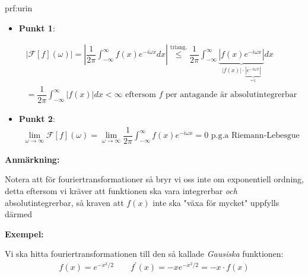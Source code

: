 \begin{prf}[Punkt 1,2]{prf:urin}
  \begin{itemize}
    \item\textbf{Punkt 1}:\par
      \begin{equation*}
        \begin{gathered}
          \left|\mathcal{F}[f](\omega)\right| = \left|\dfrac{1}{2\pi}\int_{-\infty}^{\infty}f(x)e^{-i\omega x}dx\right|\stackrel{\text{triang.}}{\leq}\dfrac{1}{2\pi}\int_{-\infty}^{\infty}\underbrace{\left|f(x)e^{-i\omega x}\right|}_{\text{$\left|f(x)\right|\cdot\underbrace{\left|e^{-i\omega x}\right|}_{\text{=1}}$}}dx\\
          = \dfrac{1}{2\pi}\int_{-\infty}^{\infty}\left|f(x)\right|dx<\infty\text{ eftersom $f$ per antagande är absolutintegrerbar}
        \end{gathered}
      \end{equation*}
      \par\bigskip
    \item\textbf{Punkt 2}:
      \begin{equation*}
        \begin{gathered}
          \lim_{\omega\to\infty}\mathcal{F}[f](\omega) = \lim_{\omega\to\infty}\dfrac{1}{2\pi}\int_{-\infty}^{\infty}f(x)e^{-i\omega x} = 0\text{ p.g.a Riemann-Lebesgue}
        \end{gathered}
      \end{equation*}
  \end{itemize}
\end{prf}
\par\bigskip
\noindent\textbf{Anmärkning:}\par
\noindent Notera att för fouriertransformationer så bryr vi oss inte om exponentiell ordning, detta eftersom vi kräver att funktionen ska vara integrerbar \textit{och} absolutintegrerbar, så kraven att $f(x)$ inte ska "växa för mycket" uppfylls därmed
\par\bigskip
\noindent\textbf{Exempel:}\par
\noindent Vi ska hitta fouriertransformationen till den så kallade \textit{Gausiska} funktionen:
\begin{equation*}
  \begin{gathered}
    f(x) = e^{-x^2/2}\qquad f^{\prime}(x) = -xe^{-x^2/2} = -x\cdot f(x)
  \end{gathered}
\end{equation*}
\par\bigskip
